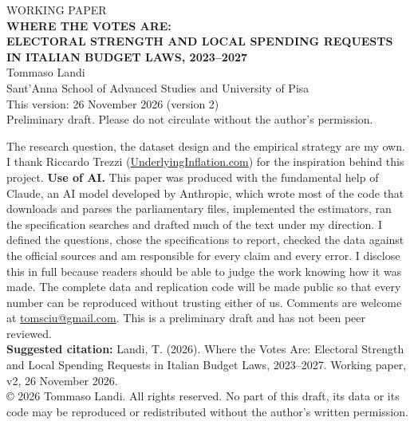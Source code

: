 \documentclass[12pt]{article}
\begin{document}
\begin{titlepage}
\centering
\vspace*{0.2cm}
{\large WORKING PAPER}\\[1.2cm]
{\Large \textbf{WHERE THE VOTES ARE:\\[4pt] ELECTORAL STRENGTH AND LOCAL SPENDING REQUESTS\\[4pt] IN ITALIAN BUDGET LAWS, 2023--2027}}\\[1.4cm]
{\large Tommaso Landi}\\[4pt]
Sant'Anna School of Advanced Studies and University of Pisa\\[1.2cm]
This version: 26 November 2026 (version 2)\\[0.4cm]
Preliminary draft. Please do not circulate without the author's permission.\\[1.0cm]
\begin{minipage}{0.9\textwidth}\footnotesize\singlespacing
\noindent The research question, the dataset design and the empirical strategy are my own. I thank Riccardo Trezzi (\href{https://underlyinginflation.com}{UnderlyingInflation.com}) for the inspiration behind this project. \textbf{Use of AI.} This paper was produced with the fundamental help of Claude, an AI model developed by Anthropic, which wrote most of the code that downloads and parses the parliamentary files, implemented the estimators, ran the specification searches and drafted much of the text under my direction. I defined the questions, chose the specifications to report, checked the data against the official sources and am responsible for every claim and every error. I disclose this in full because readers should be able to judge the work knowing how it was made. The complete data and replication code will be made public so that every number can be reproduced without trusting either of us. Comments are welcome at \href{mailto:tomsciu@gmail.com}{tomsciu@gmail.com}. This is a preliminary draft and has not been peer reviewed.\\[6pt]
\textbf{Suggested citation:} Landi, T. (2026). Where the Votes Are: Electoral Strength and Local Spending Requests in Italian Budget Laws, 2023--2027. Working paper, v2, 26 November 2026.\\[4pt]
\copyright{} 2026 Tommaso Landi. All rights reserved. No part of this draft, its data or its code may be reproduced or redistributed without the author's written permission.
\end{minipage}
\end{titlepage}
\end{document}
